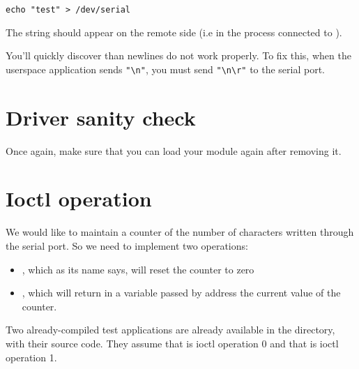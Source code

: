 \begin{verbatim}
echo "test" > /dev/serial
\end{verbatim}

The  string should appear on the remote side (i.e in
the  process connected to ).

You'll quickly discover than newlines do not work properly. To fix
this, when the userspace application sends \verb+"\n"+, you must send
\verb+"\n\r"+ to the serial port.

\section{Driver sanity check}

Once again, make sure that you can load your module again after
removing it.

\section{Ioctl operation}

We would like to maintain a counter of the number of characters
written through the serial port. So we need to implement two
 operations:
\begin{itemize}

 \item {}, which as its name says, will
   reset the counter to zero

 \item {}, which will return in a variable
   passed by address the current value of the counter.

\end{itemize}

Two already-compiled test applications are already available in the
 directory, with their source code. They assume that
 is ioctl operation 0 and that
 is ioctl operation 1.
